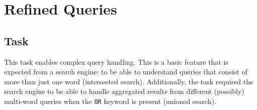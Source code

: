\chapter{Refined Queries}



\section{Task} %
This task enables complex query handling. This is a basic feature that is expected from a search engine: to be able to understand queries that consist of more than just one word (intersected search). Additionally, the task required the search engine to be able to handle aggregated results from different (possibly) multi-word queries when the {\tt OR} keyword is present (unioned search).

